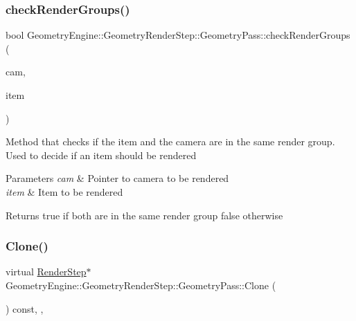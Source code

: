 \subsubsection{\texorpdfstring{checkRenderGroups()}{checkRenderGroups()}}
{\footnotesize\ttfamily bool Geometry\+Engine\+::\+Geometry\+Render\+Step\+::\+Geometry\+Pass\+::check\+Render\+Groups (\begin{DoxyParamCaption}\item[{\mbox{\hyperlink{class_geometry_engine_1_1_geometry_world_item_1_1_geometry_camera_1_1_camera}{Geometry\+World\+Item\+::\+Geometry\+Camera\+::\+Camera}} $\ast$}]{cam,  }\item[{\mbox{\hyperlink{class_geometry_engine_1_1_geometry_world_item_1_1_geometry_item_1_1_geometry_item}{Geometry\+World\+Item\+::\+Geometry\+Item\+::\+Geometry\+Item}} $\ast$}]{item }\end{DoxyParamCaption})\hspace{0.3cm}{\ttfamily [protected]}}

Method that checks if the item and the camera are in the same render group. Used to decide if an item should be rendered 
\begin{DoxyParams}{Parameters}
{\em cam} & Pointer to camera to be rendered \\
\hline
{\em item} & Item to be rendered \\
\hline
\end{DoxyParams}
\begin{DoxyReturn}{Returns}
true if both are in the same render group false otherwise 
\end{DoxyReturn}
\mbox{\label{class_geometry_engine_1_1_geometry_render_step_1_1_geometry_pass_a12e85a0169cb7b92cb8bd7b7fe100b33}} 
\subsubsection{\texorpdfstring{Clone()}{Clone()}}
{\footnotesize\ttfamily virtual \mbox{\hyperlink{class_geometry_engine_1_1_geometry_render_step_1_1_render_step}{Render\+Step}}$\ast$ Geometry\+Engine\+::\+Geometry\+Render\+Step\+::\+Geometry\+Pass\+::\+Clone (\begin{DoxyParamCaption}{ }\end{DoxyParamCaption}) const\hspace{0.3cm}{\ttfamily [inline]}, {\ttfamily [override]}, {\ttfamily [virtual]}}


